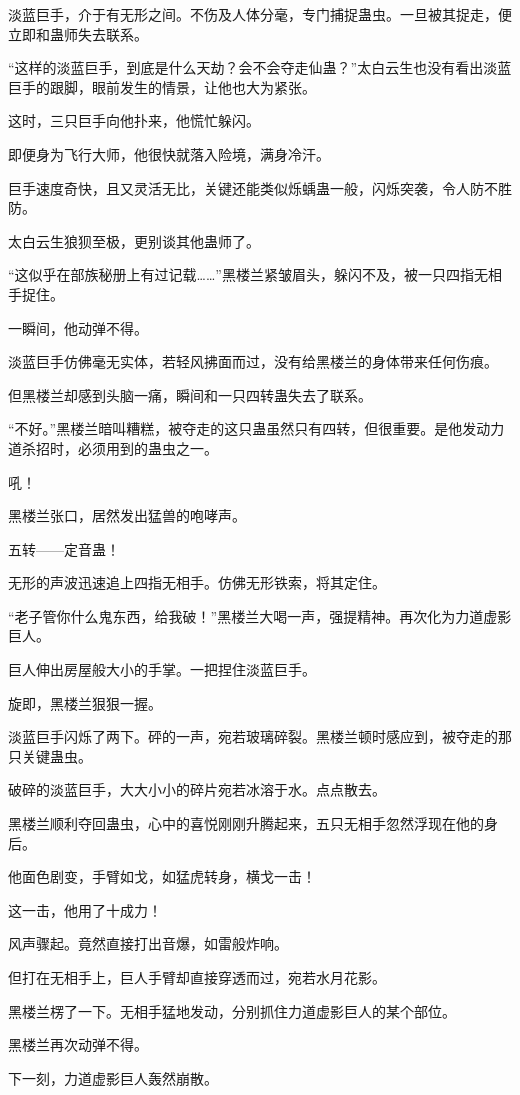 \begin{this_body}
淡蓝巨手，介于有无形之间。不伤及人体分毫，专门捕捉蛊虫。一旦被其捉走，便立即和蛊师失去联系。

“这样的淡蓝巨手，到底是什么天劫？会不会夺走仙蛊？”太白云生也没有看出淡蓝巨手的跟脚，眼前发生的情景，让他也大为紧张。

这时，三只巨手向他扑来，他慌忙躲闪。

即便身为飞行大师，他很快就落入险境，满身冷汗。

巨手速度奇快，且又灵活无比，关键还能类似烁蝺蛊一般，闪烁突袭，令人防不胜防。

太白云生狼狈至极，更别谈其他蛊师了。

“这似乎在部族秘册上有过记载……”黑楼兰紧皱眉头，躲闪不及，被一只四指无相手捉住。

一瞬间，他动弹不得。

淡蓝巨手仿佛毫无实体，若轻风拂面而过，没有给黑楼兰的身体带来任何伤痕。

但黑楼兰却感到头脑一痛，瞬间和一只四转蛊失去了联系。

“不好。”黑楼兰暗叫糟糕，被夺走的这只蛊虽然只有四转，但很重要。是他发动力道杀招时，必须用到的蛊虫之一。

吼！

黑楼兰张口，居然发出猛兽的咆哮声。

五转——定音蛊！

无形的声波迅速追上四指无相手。仿佛无形铁索，将其定住。

“老子管你什么鬼东西，给我破！”黑楼兰大喝一声，强提精神。再次化为力道虚影巨人。

巨人伸出房屋般大小的手掌。一把捏住淡蓝巨手。

旋即，黑楼兰狠狠一握。

淡蓝巨手闪烁了两下。砰的一声，宛若玻璃碎裂。黑楼兰顿时感应到，被夺走的那只关键蛊虫。

破碎的淡蓝巨手，大大小小的碎片宛若冰溶于水。点点散去。

黑楼兰顺利夺回蛊虫，心中的喜悦刚刚升腾起来，五只无相手忽然浮现在他的身后。

他面色剧变，手臂如戈，如猛虎转身，横戈一击！

这一击，他用了十成力！

风声骤起。竟然直接打出音爆，如雷般炸响。

但打在无相手上，巨人手臂却直接穿透而过，宛若水月花影。

黑楼兰楞了一下。无相手猛地发动，分别抓住力道虚影巨人的某个部位。

黑楼兰再次动弹不得。

下一刻，力道虚影巨人轰然崩散。


\end{this_body}

